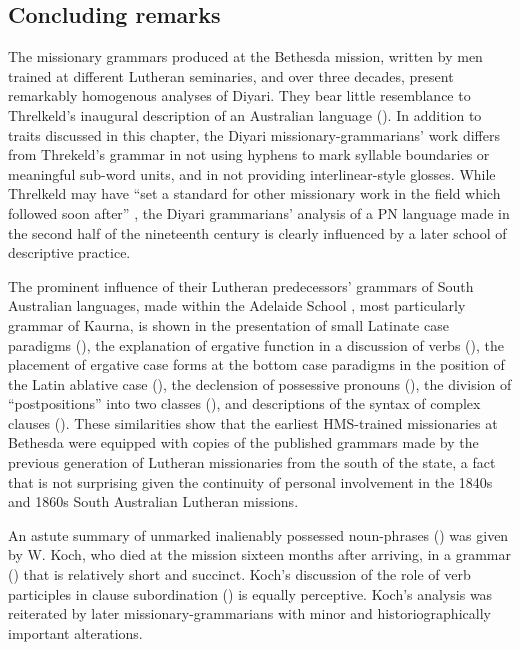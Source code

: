 \subsection{Concluding remarks}
\label{sec:key:8.7.4}

The missionary grammars produced at the Bethesda mission, written by men trained at different Lutheran seminaries, and over three decades, present remarkably homogenous analyses of Diyari. They bear little resemblance to Threlkeld’s inaugural description of an Australian language (\citeyear{threlkeld_australian_1834}). In addition to traits discussed in this chapter, the Diyari missionary-grammarians' work differs from Threkeld’s grammar in not using hyphens to mark syllable boundaries or meaningful sub-word units, and in not providing interlinear-style glosses. While Threlkeld may have “set a standard for other missionary work in the field which followed soon after” \citep[269]{carey_lancelot_2004}, the Diyari grammarians' analysis of a PN language made in the second half of the nineteenth century is clearly influenced by a later school of descriptive practice.

The prominent influence of their Lutheran predecessors' grammars of South Australian languages, made within the Adelaide School \citep[410]{simpson_notes_1992}, most particularly  grammar of Kaurna, is shown in the presentation of small Latinate case paradigms (), the explanation of ergative function in a discussion of verbs (), the placement of ergative case forms at the bottom case paradigms in the position of the Latin ablative case (), the declension of possessive pronouns (), the division of “postpositions” into two classes (), and descriptions of the syntax of complex clauses (). These similarities show that the earliest HMS-trained missionaries at Bethesda were equipped with copies of the published grammars made by the previous generation of Lutheran missionaries from the south of the state, a fact that is not surprising given the continuity of personal involvement in the 1840s and 1860s South Australian Lutheran missions.

An astute summary of unmarked inalienably possessed noun-phrases () was given by W. Koch, who died at the mission sixteen months after arriving, in a grammar (\citeyear{koch_untitled_1868}) that is relatively short and succinct. Koch’s discussion of the role of verb participles in clause subordination () is equally perceptive. Koch’s analysis was reiterated by later missionary-grammarians with minor and historiographically important alterations.

